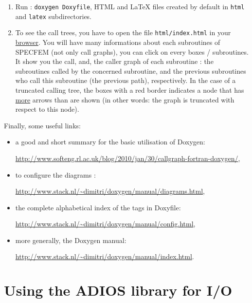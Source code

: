 \begin{enumerate}
\item Run : \texttt{doxygen Doxyfile}, HTML and LaTeX files created by default in \texttt{html} and \texttt{latex} subdirectories.

\item To see the call trees, you have to open the file \texttt{html/index.html} in your \underline{browser}. You will have many informations about each subroutines of SPECFEM (not only call graphs), you can click on every boxes / subroutines. It show you the call, and, the caller graph of each subroutine : the subroutines called by the concerned subroutine, and the previous subroutines who call this subroutine (the previous path), respectively. In the case of a truncated calling tree, the boxes with a red border indicates a node that has \underline{more} arrows than are shown (in other words: the graph is truncated with respect to this node).

\end{enumerate}

\medskip

\noindent Finally, some useful links:

\begin{itemize}
\item[\textbullet] a good and short summary for the basic utilisation of Doxygen:

\url{http://www.softeng.rl.ac.uk/blog/2010/jan/30/callgraph-fortran-doxygen/},

\item[\textbullet] to configure the diagrams :

\url{http://www.stack.nl/~dimitri/doxygen/manual/diagrams.html},

\item[\textbullet] the complete alphabetical index of the tags in Doxyfile:

\url{http://www.stack.nl/~dimitri/doxygen/manual/config.html},

\item[\textbullet] more generally, the Doxygen manual:

\url{http://www.stack.nl/~dimitri/doxygen/manual/index.html}.

\end{itemize}

\medskip

\section{Using the ADIOS library for I/O}

